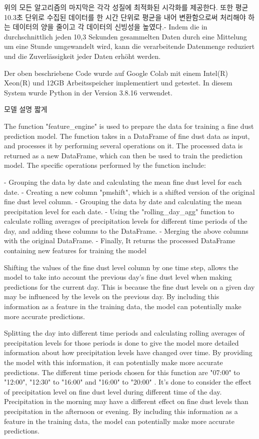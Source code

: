         위의 모든 알고리즘의 마지막은 각각 성질에 최적화된 시각화를 제공한다. 또한 평균 10.3초 단위로 수집된 데이터를 한 시간 단위로 평균을 내어 변환함으로써 처리해야 하는 데이터의 양을 줄이고 각 데이터의 신빙성을 높였다.- Indem die in durchschnittlich jeden 10,3 Sekunden gesammelten Daten durch eine Mittelung um eine Stunde umgewandelt wird, kann die verarbeitende Datenmenge reduziert und die Zuverlässigkeit jeder Daten erhöht werden.



        Der oben beschriebene Code wurde auf Google Colab mit einem Intel(R) Xeon(R) und 12GB Arbeitsspeicher implementiert und getestet. In diesem System wurde Python in der Version 3.8.16 verwendet.

    모델 설명 짧게
        
        The function "feature_engine" is used to prepare the data for training a fine dust prediction model. The function takes in a DataFrame of fine dust data as input, and processes it by performing several operations on it. The processed data is returned as a new DataFrame, which can then be used to train the prediction model. The specific operations performed by the function include:

        - Grouping the data by date and calculating the mean fine dust level for each date.
        - Creating a new column "pmshift", which is a shifted version of the original fine dust level column.
        - Grouping the data by date and calculating the mean precipitation level for each date.
        - Using the "rolling_day_agg" function to calculate rolling averages of precipitation levels for different time periods of the day, and adding these columns to the DataFrame.
        - Merging the above columns with the original DataFrame.
        - Finally, It returns the processed DataFrame containing new features for training the model
        
        Shifting the values of the fine dust level column by one time step, allows the model to take into account the previous day's fine dust level when making predictions for the current day. This is because the fine dust levels on a given day may be influenced by the levels on the previous day. By including this information as a feature in the training data, the model can potentially make more accurate predictions.
        
        Splitting the day into different time periods and calculating rolling averages of precipitation levels for those periods is done to give the model more detailed information about how precipitation levels have changed over time. By providing the model with this information, it can potentially make more accurate predictions. The different time periods chosen for this function are "07:00" to "12:00", "12:30" to "16:00" and "16:00" to "20:00" . It's done to consider the effect of precipitation level on fine dust level during different time of the day. Precipitation in the morning may have a different effect on fine dust levels than precipitation in the afternoon or evening. By including this information as a feature in the training data, the model can potentially make more accurate predictions.
        
